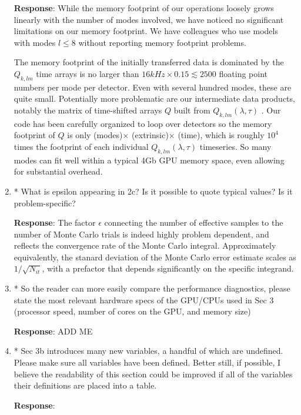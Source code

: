 \documentclass[onecolumn]{revtex4}
\newcommand\editremark[1]{{\color{red} #1}}
\begin{document}
\begin{enumerate}
\noindent \textbf{Response}: While the memory footprint of our operations loosely grows linearly with the number of
modes involved, we have noticed no significant limitations on our memory footprint.  We have colleagues who use models with modes
$l \le 8$ without reporting memory footprint problems.   

The memory footprint of the initially transferred data is dominated by the $Q_{k,lm}$ time arrays is no larger than $16 kHz
\times 0.15  \lesssim 2500$ floating point numbers per mode per detector.  Even with several hundred modes, these are
quite small.
Potentially more problematic are our intermediate data products, notably the matrix of time-shifted arrays $Q$ built
from $Q_{k,lm}(\lambda,\tau)$ .  Our code has been carefully
organized to loop over detectors so the memory footprint of $Q$ is only (modes)$\times$ (extrinsic)$\times$ (time),
which is roughly $10^4$ times the footprint of each individual $Q_{k,lm}(\lambda,\tau)$ timeseries.  So many modes can
fit well within a typical 4Gb GPU memory space, even allowing for substantial overhead.


\item * What is epsilon appearing in 2c? Is it possible to quote typical
values? Is it problem-specific?


\noindent \textbf{Response}:   The factor $\epsilon$ connecting the number of effective samples to the number of Monte
Carlo trials is indeed highly problem dependent, and reflects the convergence rate of the Monte Carlo integral.
Approximately equivalently, the stanard deviation of the Monte Carlo error estimate scales as $1/\sqrt{N_{it}}$, with a
prefactor that  depends significantly on the specific integrand.


\item * So the reader can more easily compare the performance diagnostics,
please state the most relevant hardware specs of the GPU/CPUs used in
Sec 3 (processor speed, number of cores on the GPU, and memory size)

\noindent \textbf{Response}:    \editremark{ADD ME}

\item * Sec 3b introduces many new variables, a handful of which are
undefined. Please make sure all variables have been defined. Better
still, if possible, I believe the readability of this section could be
improved if all of the variables their definitions are placed into a
table.

\noindent \textbf{Response}:


\end{enumerate}
\end{document}
